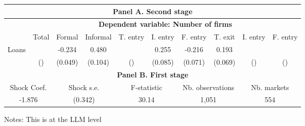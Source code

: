 \centering
\begin{threeparttable}
\begin{tabular}{lccccccccc}
\toprule
\multicolumn{10}{c}{\textbf{Panel A. Second stage}} \\
\midrule
& \multicolumn{9}{c}{\textbf{Dependent variable: Number of firms}} \\
\cmidrule(lr){2-10}
& Total 
& Formal 
& Informal
& T. entry 
& I. entry 
& F. entry 
& T. exit 
& I. entry 
& F. entry \\
\midrule
Loans 
&    & -0.234  & 0.480   &    & 0.255   & -0.216  & 0.193   &    &  \\
& () & (0.049) & (0.104) & () & (0.085) & (0.071) & (0.069) & () & () \\
\midrule
\multicolumn{10}{c}{\textbf{Panel B. First stage}} \\
\midrule
\multicolumn{2}{c}{Shock Coef.} & \multicolumn{2}{c}{Shock s.e.} &  \multicolumn{2}{c}{F-statistic} &  \multicolumn{2}{c}{Nb. observations} & \multicolumn{2}{c}{Nb. markets} \\
\midrule
\multicolumn{2}{c}{-1.876} &  \multicolumn{2}{c}{(0.342)} &  \multicolumn{2}{c}{30.14} & \multicolumn{2}{c}{1,051} & \multicolumn{2}{c}{554} \\

\bottomrule
\end{tabular}
\begin{tablenotes}[flushleft]
\tiny
\item Notes: This is at the LLM level
\end{tablenotes}
\end{threeparttable}
